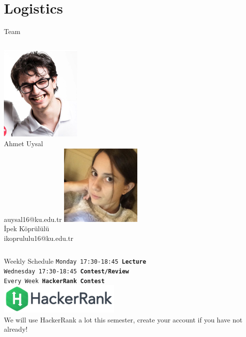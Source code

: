 	\section{Logistics}
		\begin{frame}{Team}
			\begin{columns}
				\column{5cm}
				\centering 
					\includegraphics[width=4.0cm]{images/ahmet.png}\\
					Ahmet Uysal\\
					auysal16@ku.edu.tr
				\column{5cm}
				\centering
					\includegraphics[width=4.0cm]{images/ipek.jpeg}\\
					İpek Köprülülü\\
					ikoprululu16@ku.edu.tr
			\end{columns}
		\end{frame}

		\begin{frame}{Weekly Schedule}
			\LARGE
			\texttt{Monday 17:30-18:45 \textbf{Lecture}}\\
			\texttt{Wednesday 17:30-18:45 \textbf{Contest/Review}}\\  
			\texttt{Every Week \textbf{HackerRank Contest}}\\
			\vspace{4mm}
			\centering
			\includegraphics[width=6cm]{images/hackerrank.png}\\
			We will use HackerRank a lot this semester, create your account if you have not already!
		\end{frame}


